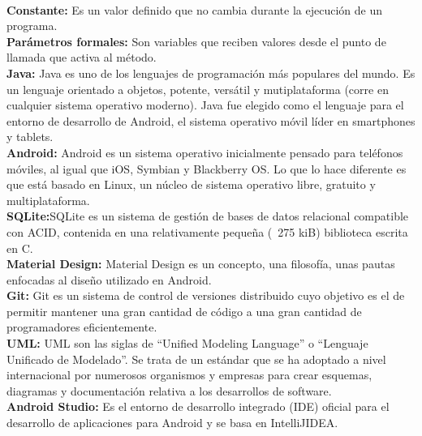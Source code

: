 \\
\textbf{Constante:} Es un valor definido que no cambia durante la ejecución de un programa.
\\
\textbf{Parámetros formales:} Son variables que reciben valores desde el punto de llamada que activa al método.
\\
\textbf{Java:} Java es uno de los lenguajes de programación más populares del mundo. Es un lenguaje orientado a objetos, potente, versátil y mutiplataforma (corre en cualquier sistema operativo moderno). Java fue elegido como el lenguaje para el entorno de desarrollo de Android, el sistema operativo móvil líder en smartphones y tablets.
\\
\textbf{Android:} Android es un sistema operativo inicialmente pensado para teléfonos móviles, al igual que iOS, Symbian y Blackberry OS. Lo que lo hace diferente es que está basado en Linux, un núcleo de sistema operativo libre, gratuito y multiplataforma.
\\
\textbf{SQLite:}SQLite es un sistema de gestión de bases de datos relacional compatible con ACID, contenida en una relativamente pequeña (~275 kiB) biblioteca escrita en C.
\\
\textbf{Material Design:} Material Design es un concepto, una filosofía, unas pautas enfocadas al diseño utilizado en Android.
\\
\textbf{Git:} Git es un sistema de control de versiones distribuido cuyo objetivo es el de permitir mantener una gran cantidad de código a una gran cantidad de programadores eficientemente.
\\
\textbf{UML:} UML son las siglas de “Unified Modeling Language” o “Lenguaje Unificado de Modelado”. Se trata de un estándar que se ha adoptado a nivel internacional por numerosos organismos y empresas para crear esquemas, diagramas y documentación relativa a los desarrollos de software.
\\
\textbf{Android Studio:} Es el entorno de desarrollo integrado (IDE) oficial para el desarrollo de aplicaciones para Android y se basa en IntelliJIDEA.

